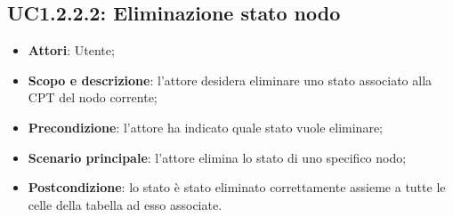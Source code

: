 \subsection{UC1.2.2.2: Eliminazione stato nodo} 
\hypertarget{UC1.2.2.2}{} 
\begin{itemize} 
	\item{\textbf{Attori}: Utente;} 
	\item{\textbf{Scopo e descrizione}: l'attore desidera eliminare uno stato associato alla CPT del nodo corrente;} 
	\item{\textbf{Precondizione}: l'attore ha indicato quale stato vuole eliminare;} 
	\item{\textbf{Scenario principale}: l'attore elimina lo stato di uno specifico nodo;} 
	\item{\textbf{Postcondizione}: lo stato è stato eliminato correttamente assieme a tutte le celle della tabella ad esso associate.} 
\end{itemize} 
